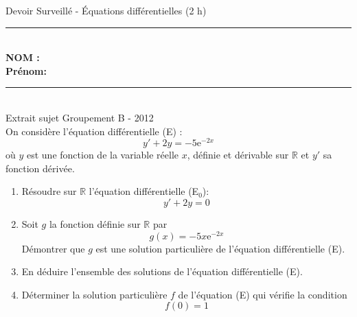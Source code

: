 \documentclass[11pt,a4paper]{article}
\newcommand{\cadreblanc}[1]{%
	\medskip\framebox[\linewidth][c]{%
		\rule{0mm}{#1mm}}\par
	\medskip}
\begin{document}
	
	
	\setlength{\parindent}{0cm}
	
	
	\bigskip
	
	\center \LARGE{Devoir Surveillé  - Équations différentielles (2 h)}\
	\\[0,3cm]
	
	\normalsize
	
	\hrule\
	\\[0,2cm]
	
	\flushleft \textbf{NOM :\\
		Prénom:\\[0,5cm]
	}
	\hrule\
	\\[0,2cm]
	
	
	
	 Extrait sujet Groupement B - 2012\\[2mm]
	On considère l'équation différentielle (E) :\[
	y' + 2y = -5\text{e}^{-2x}\]
	où $y$ est une fonction de la variable réelle $x$, définie
	et dérivable sur $\mathbb{R}$ et $y'$ sa fonction dérivée.
	\\
	\begin{enumerate}
		\item Résoudre sur $\mathbb{R}$ l'équation différentielle (E$_{0}$):
		\[ y' + 2y = 0\]
		
		\vspace{-5mm}
		\cadreblanc{25}
		
		
		\item Soit $g$ la fonction définie sur $\mathbb{R}$ par 
		\[g(x) = -5x\text{e}^{-2x}\]
		Démontrer que $g$ est une solution particulière de l'équation différentielle (E).
		
		\cadreblanc{50}
		
		\item En déduire l'ensemble des solutions de l'équation différentielle (E).
		
		\cadreblanc{20}
		
		\item Déterminer la solution particulière $f$ de l'équation (E) qui vérifie la condition \[f(0)=1\]
		
		\vspace{-5mm}
		
		\cadreblanc{20}
		
	\end{enumerate} 
	
	
	
	
	\vfill 
	
\end{document}
